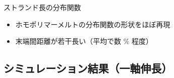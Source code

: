 \documentclass[11pt, dvipdfmx]{beamer}
\begin{document}
\begin{frame}
\begin{columns}[totalwidth=\linewidth]
\begin{figure}
\end{figure}
\end{columns}
\vspace{-2mm}
\begin{exampleblock}{ストランド長の分布関数}
\begin{itemize}
\item
ホモポリマーメルトの分布関数の形状をほぼ再現
\item
末端間距離が若干長い（平均で数 \% 程度）
\end{itemize}
\end{exampleblock}
\end{frame}
\subsection{シミュレーション結果（一軸伸長）}
\end{document}
